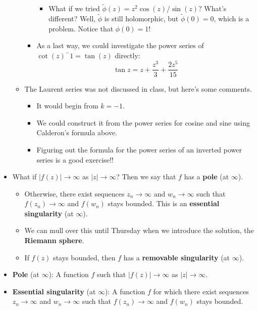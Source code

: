 \documentclass[../notes.tex]{subfiles}
\begin{document}
\begin{itemize}
\begin{itemize}
\begin{itemize}
            \begin{itemize}
                \item What if we tried $\tilde{\phi}(z)=z^2\cos(z)/\sin(z)$? What's different? Well, $\tilde{\phi}$ is still holomorphic, but $\tilde{\phi}(0)=0$, which is a problem. Notice that $\phi(0)=1$!
            \end{itemize}
            \item As a last way, we could investigate the power series of $\cot(z)^-1=\tan(z)$ directly:
            \begin{equation*}
                \tan z = z+\frac{z^3}{3}+\frac{2z^5}{15}
            \end{equation*}
        \end{itemize}
        \item The Laurent series was not discussed in class, but here's some comments.
        \begin{itemize}
            \item It would begin from $k=-1$.
            \item We could construct it from the power series for cosine and sine using Calderon's formula above.
            \item Figuring out the formula for the power series of an inverted power series is a good exercise!!
        \end{itemize}
    \end{itemize}
    \item What if $|f(z)|\to\infty$ as $|z|\to\infty$? Then we say that $f$ has a \textbf{pole} (at $\infty$).
    \begin{itemize}
        \item Otherwise, there exist sequences $z_n\to\infty$ and $w_n\to\infty$ such that $f(z_n)\to\infty$ and $f(w_n)$ stays bounded. This is an \textbf{essential singularity} (at $\infty$).
        \item We can mull over this until Thursday when we introduce the solution, the \textbf{Riemann sphere}.
        \item If $f(z)$ stays bounded, then $f$ has a \textbf{removable singularity} (at $\infty$).
    \end{itemize}
    \item \textbf{Pole} (at $\infty$): A function $f$ such that $|f(z)|\to\infty$ as $|z|\to\infty$.
    \item \textbf{Essential singularity} (at $\infty$): A function $f$ for which there exist sequences $z_n\to\infty$ and $w_n\to\infty$ such that $f(z_n)\to\infty$ and $f(w_n)$ stays bounded.

\end{itemize}
\end{document}
